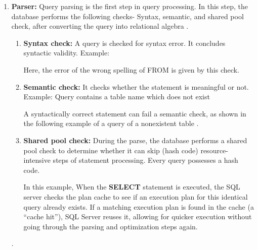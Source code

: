 \begin{enumerate}
\item \textbf{Parser:} Query parsing is the first step in query processing. In this step, the database performs the following checks- Syntax, semantic, and shared pool check, after converting the query into relational algebra \cite{wwwnaukricom-no-date}.

    \begin{enumerate}
        \item \textbf{Syntax check:} A query is checked for syntax error. It concludes syntactic validity. Example:
        
        
          Here, the error of the wrong spelling of FROM is given by this check.\vspace{.4cm}
          
        \item \textbf{Semantic check:} It checks whether the statement is meaningful or not. Example: Query contains a table name which does not exist
        
        
        
        A syntactically correct statement can fail a semantic check, as shown in the following example of a query of a nonexistent table \cite{Oracle}.\vspace{.4cm}
        
        \item \textbf{Shared pool check:} During the parse, the database performs a shared pool check to determine whether it can skip (hash code) resource-intensive steps of statement processing. Every query possesses a hash code.\vspace{.4cm}
        
        
        
        In this example, When the \textbf{SELECT} statement is executed, the SQL server checks the plan cache to see if an execution plan for this identical query already exists. If a matching execution plan is found in the cache (a ``cache hit''), SQL Server reuses it, allowing for quicker execution without going through the parsing and optimization steps again.
        
    \end{enumerate}.
    
    

\end{enumerate}
